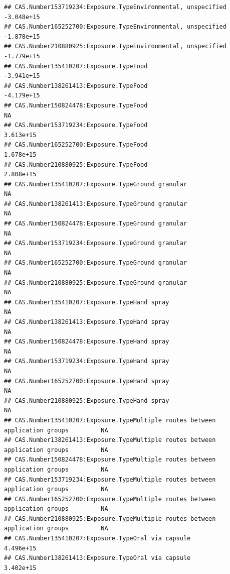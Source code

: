 \documentclass[
  12pt,
]{article}
\begin{document}
\begin{verbatim}
## CAS.Number153719234:Exposure.TypeEnvironmental, unspecified                 -3.048e+15
## CAS.Number165252700:Exposure.TypeEnvironmental, unspecified                 -1.878e+15
## CAS.Number210880925:Exposure.TypeEnvironmental, unspecified                 -1.779e+15
## CAS.Number135410207:Exposure.TypeFood                                       -3.941e+15
## CAS.Number138261413:Exposure.TypeFood                                       -4.179e+15
## CAS.Number150824478:Exposure.TypeFood                                               NA
## CAS.Number153719234:Exposure.TypeFood                                        3.613e+15
## CAS.Number165252700:Exposure.TypeFood                                        1.678e+15
## CAS.Number210880925:Exposure.TypeFood                                        2.808e+15
## CAS.Number135410207:Exposure.TypeGround granular                                    NA
## CAS.Number138261413:Exposure.TypeGround granular                                    NA
## CAS.Number150824478:Exposure.TypeGround granular                                    NA
## CAS.Number153719234:Exposure.TypeGround granular                                    NA
## CAS.Number165252700:Exposure.TypeGround granular                                    NA
## CAS.Number210880925:Exposure.TypeGround granular                                    NA
## CAS.Number135410207:Exposure.TypeHand spray                                         NA
## CAS.Number138261413:Exposure.TypeHand spray                                         NA
## CAS.Number150824478:Exposure.TypeHand spray                                         NA
## CAS.Number153719234:Exposure.TypeHand spray                                         NA
## CAS.Number165252700:Exposure.TypeHand spray                                         NA
## CAS.Number210880925:Exposure.TypeHand spray                                         NA
## CAS.Number135410207:Exposure.TypeMultiple routes between application groups         NA
## CAS.Number138261413:Exposure.TypeMultiple routes between application groups         NA
## CAS.Number150824478:Exposure.TypeMultiple routes between application groups         NA
## CAS.Number153719234:Exposure.TypeMultiple routes between application groups         NA
## CAS.Number165252700:Exposure.TypeMultiple routes between application groups         NA
## CAS.Number210880925:Exposure.TypeMultiple routes between application groups         NA
## CAS.Number135410207:Exposure.TypeOral via capsule                            4.496e+15
## CAS.Number138261413:Exposure.TypeOral via capsule                            3.402e+15

\end{verbatim}
\end{document}
